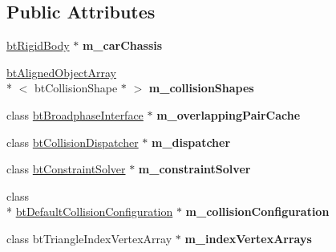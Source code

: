 \subsection*{Public Attributes}
\begin{DoxyCompactItemize}
\item 
\hypertarget{class_vehicle_demo_a5d6a24d2a36290cdef2bb8244ae433df}{\hyperlink{classbt_rigid_body}{bt\+Rigid\+Body} $\ast$ {\bfseries m\+\_\+car\+Chassis}}\label{class_vehicle_demo_a5d6a24d2a36290cdef2bb8244ae433df}

\item 
\hypertarget{class_vehicle_demo_a4e68f2c33c479a0a065a8c1fecc276e0}{\hyperlink{classbt_aligned_object_array}{bt\+Aligned\+Object\+Array}\\*
$<$ bt\+Collision\+Shape $\ast$ $>$ {\bfseries m\+\_\+collision\+Shapes}}\label{class_vehicle_demo_a4e68f2c33c479a0a065a8c1fecc276e0}

\item 
\hypertarget{class_vehicle_demo_a5aae97fea29c8059f8693a67788d280d}{class \hyperlink{classbt_broadphase_interface}{bt\+Broadphase\+Interface} $\ast$ {\bfseries m\+\_\+overlapping\+Pair\+Cache}}\label{class_vehicle_demo_a5aae97fea29c8059f8693a67788d280d}

\item 
\hypertarget{class_vehicle_demo_a9cc8aec961e8e7ce3a3a429365df4346}{class \hyperlink{classbt_collision_dispatcher}{bt\+Collision\+Dispatcher} $\ast$ {\bfseries m\+\_\+dispatcher}}\label{class_vehicle_demo_a9cc8aec961e8e7ce3a3a429365df4346}

\item 
\hypertarget{class_vehicle_demo_a109fa86b46cc074852dcf0f49e743e84}{class \hyperlink{classbt_constraint_solver}{bt\+Constraint\+Solver} $\ast$ {\bfseries m\+\_\+constraint\+Solver}}\label{class_vehicle_demo_a109fa86b46cc074852dcf0f49e743e84}

\item 
\hypertarget{class_vehicle_demo_ade863d735a14d7168deb64bba49b288b}{class \\*
\hyperlink{classbt_default_collision_configuration}{bt\+Default\+Collision\+Configuration} $\ast$ {\bfseries m\+\_\+collision\+Configuration}}\label{class_vehicle_demo_ade863d735a14d7168deb64bba49b288b}

\item 
\hypertarget{class_vehicle_demo_acf2096930f6a7afa5e0422139a41869c}{class bt\+Triangle\+Index\+Vertex\+Array $\ast$ {\bfseries m\+\_\+index\+Vertex\+Arrays}}\label{class_vehicle_demo_acf2096930f6a7afa5e0422139a41869c}


\end{DoxyCompactItemize}
